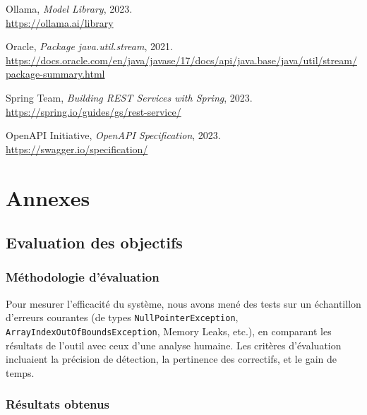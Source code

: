 \documentclass[12pt,a4paper]{report}
\begin{document}
	\begin{enumerate}[label=\textbf{[\arabic*]}, start=2]
		\item Ollama, \emph{Model Library}, 2023. \\
		\url{https://ollama.ai/library}
		
		\item Oracle, \emph{Package java.util.stream}, 2021. \\
		\url{https://docs.oracle.com/en/java/javase/17/docs/api/java.base/java/util/stream/package-summary.html}
		
		\item Spring Team, \emph{Building REST Services with Spring}, 2023. \\
		\url{https://spring.io/guides/gs/rest-service/}
		
		\item OpenAPI Initiative, \emph{OpenAPI Specification}, 2023. \\
		\url{https://swagger.io/specification/}
	\end{enumerate}
	
	\chapter*{Annexes}
	
	\section*{Evaluation des objectifs}
	
	\subsection*{Méthodologie d'évaluation}
	
	Pour mesurer l’efficacité du système, nous avons mené des tests sur un échantillon d'erreurs courantes (de types \verb|NullPointerException|, \verb|ArrayIndexOutOfBoundsException|, Memory Leaks, etc.), en comparant les résultats de l’outil avec ceux d’une analyse humaine. Les critères d’évaluation incluaient la précision de détection, la pertinence des correctifs, et le gain de temps.
	
	\subsection*{Résultats obtenus}
	
\end{document}
